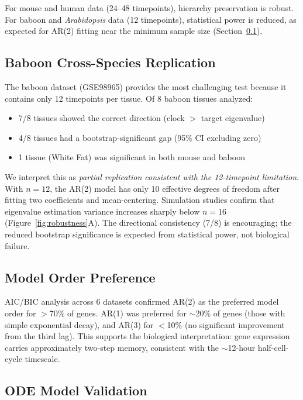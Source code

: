 \documentclass[11pt,letterpaper]{article}
\begin{document}
For mouse and human data (24--48 timepoints), hierarchy preservation is robust. For baboon and \textit{Arabidopsis} data (12 timepoints), statistical power is reduced, as expected for AR(2) fitting near the minimum sample size (Section~\ref{sec:baboon}).

\subsection{Baboon Cross-Species Replication}
\label{sec:baboon}

The baboon dataset (GSE98965) \citep{mure2018diurnal} provides the most challenging test because it contains only 12 timepoints per tissue. Of 8 baboon tissues analyzed:
\begin{itemize}
\item 7/8 tissues showed the correct direction (clock $>$ target eigenvalue)
\item 4/8 tissues had a bootstrap-significant gap (95\% CI excluding zero)
\item 1 tissue (White Fat) was significant in both mouse and baboon
\end{itemize}

We interpret this as \textit{partial replication consistent with the 12-timepoint limitation}. With $n = 12$, the AR(2) model has only 10 effective degrees of freedom after fitting two coefficients and mean-centering. Simulation studies confirm that eigenvalue estimation variance increases sharply below $n = 16$ (Figure~\ref{fig:robustness}A). The directional consistency (7/8) is encouraging; the reduced bootstrap significance is expected from statistical power, not biological failure.

\subsection{Model Order Preference}

AIC/BIC analysis across 6 datasets confirmed AR(2) as the preferred model order for $>$70\% of genes. AR(1) was preferred for $\sim$20\% of genes (those with simple exponential decay), and AR(3) for $<$10\% (no significant improvement from the third lag). This supports the biological interpretation: gene expression carries approximately two-step memory, consistent with the $\sim$12-hour half-cell-cycle timescale.

\subsection{ODE Model Validation}
\end{document}
